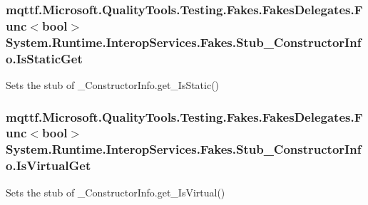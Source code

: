 \hypertarget{class_system_1_1_runtime_1_1_interop_services_1_1_fakes_1_1_stub___constructor_info_a4c606a07265dbd67f4f40af7fcd15f00}{
\subsubsection[{Is\-Static\-Get}]{\setlength{\rightskip}{0pt plus 5cm}mqttf.\-Microsoft.\-Quality\-Tools.\-Testing.\-Fakes.\-Fakes\-Delegates.\-Func$<$bool$>$ System.\-Runtime.\-Interop\-Services.\-Fakes.\-Stub\-\_\-\-Constructor\-Info.\-Is\-Static\-Get}}\label{class_system_1_1_runtime_1_1_interop_services_1_1_fakes_1_1_stub___constructor_info_a4c606a07265dbd67f4f40af7fcd15f00}


Sets the stub of \-\_\-\-Constructor\-Info.\-get\-\_\-\-Is\-Static()

\hypertarget{class_system_1_1_runtime_1_1_interop_services_1_1_fakes_1_1_stub___constructor_info_a30406159633c1609b26b4e1f6245a75b}{
\subsubsection[{Is\-Virtual\-Get}]{\setlength{\rightskip}{0pt plus 5cm}mqttf.\-Microsoft.\-Quality\-Tools.\-Testing.\-Fakes.\-Fakes\-Delegates.\-Func$<$bool$>$ System.\-Runtime.\-Interop\-Services.\-Fakes.\-Stub\-\_\-\-Constructor\-Info.\-Is\-Virtual\-Get}}\label{class_system_1_1_runtime_1_1_interop_services_1_1_fakes_1_1_stub___constructor_info_a30406159633c1609b26b4e1f6245a75b}


Sets the stub of \-\_\-\-Constructor\-Info.\-get\-\_\-\-Is\-Virtual()

